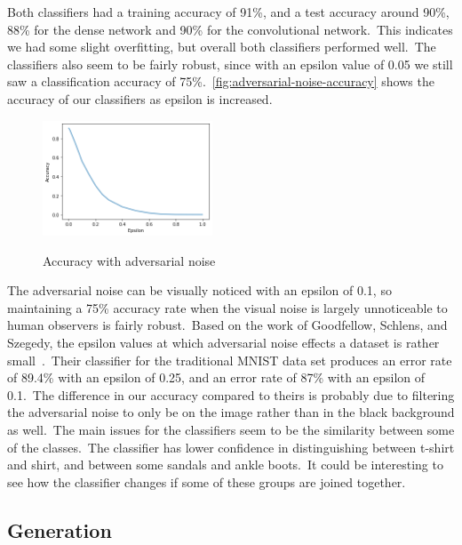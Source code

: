 \documentclass[conference]{IEEEtran}
\begin{document}
    Both classifiers had a training accuracy of 91\%, and a test accuracy around 90\%, 88\% for the dense network and 90\% for the convolutional network.\ This indicates we had some slight overfitting, but overall both classifiers performed well.\ The classifiers also seem to be fairly robust, since with an epsilon value of 0.05 we still saw a classification accuracy of 75\%.~\autoref{fig:adversarial-noise-accuracy} shows the accuracy of our classifiers as epsilon is increased.
    \begin{figure}
        \begin{center}
            \caption{Accuracy with adversarial noise}
            \includegraphics[width=0.45\textwidth]{Adversarial Accuracy.png}
            \label{fig:adversarial-noise-accuracy}
        \end{center}
    \end{figure}
    The adversarial noise can be visually noticed with an epsilon of 0.1, so maintaining a 75\% accuracy rate when the visual noise is largely unnoticeable to human observers is fairly robust.\ Based on the work of Goodfellow, Schlens, and Szegedy, the epsilon values at which adversarial noise effects a dataset is rather small~\cite{adversarialexamples}.\ Their classifier for the traditional MNIST data set produces an error rate of 89.4\% with an epsilon of 0.25, and an error rate of 87\% with an epsilon of 0.1.\ The difference in our accuracy compared to theirs is probably due to filtering the adversarial noise to only be on the image rather than in the black background as well.\ The main issues for the classifiers seem to be the similarity between some of the classes.\ The classifier has lower confidence in distinguishing between t-shirt and shirt, and between some sandals and ankle boots.\ It could be interesting to see how the classifier changes if some of these groups are joined together.

    \subsection{Generation}\label{subsec:results-generation}
\end{document}
